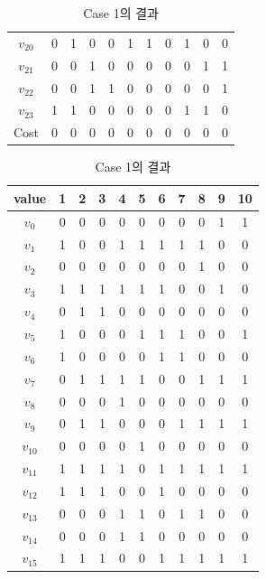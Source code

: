 \documentclass{article}
\begin{document}
\begin{table}[htb!]
\begin{minipage}{0.475\linewidth}
\begin{tabular}{c | c c c c c c c c c c}
        $v_{20}$ & 0 & 1 & 0 & 0 & 1 & 1 & 0 & 1 & 0 & 0 \\
        $v_{21}$ & 0 & 0 & 1 & 0 & 0 & 0 & 0 & 0 & 1 & 1 \\
        $v_{22}$ & 0 & 0 & 1 & 1 & 0 & 0 & 0 & 0 & 0 & 1 \\
        $v_{23}$ & 1 & 1 & 0 & 0 & 0 & 0 & 0 & 1 & 1 & 0 \\
        \hline
        Cost & 0 & 0 & 0 & 0 & 0 & 0 & 0 & 0 & 0 & 0 \\
        \hline
    \end{tabular}
    \caption{Case 1의 결과}
    \label{tab:result1}
    \end{minipage}
    \hspace{0.05\linewidth}
    \begin{minipage}{0.475\linewidth}
    \begin{tabular}{c | c c c c c c c c c c}
        \hline
        value & 1 & 2 & 3 & 4 & 5 & 6 & 7 & 8 & 9 & 10 \\
        \hline
        $v_0$ & 0 & 0 & 0 & 0 & 0 & 0 & 0 & 0 & 1 & 1 \\
        $v_1$ & 1 & 0 & 0 & 1 & 1 & 1 & 1 & 1 & 0 & 0 \\
        $v_2$ & 0 & 0 & 0 & 0 & 0 & 0 & 0 & 1 & 0 & 0 \\
        $v_3$ & 1 & 1 & 1 & 1 & 1 & 1 & 0 & 0 & 1 & 0 \\
        $v_4$ & 0 & 1 & 1 & 0 & 0 & 0 & 0 & 0 & 0 & 0 \\
        $v_5$ & 1 & 0 & 0 & 0 & 1 & 1 & 1 & 0 & 0 & 1 \\
        $v_6$ & 1 & 0 & 0 & 0 & 0 & 1 & 1 & 0 & 0 & 0 \\
        $v_7$ & 0 & 1 & 1 & 1 & 1 & 0 & 0 & 1 & 1 & 1 \\
        $v_8$ & 0 & 0 & 0 & 1 & 0 & 0 & 0 & 0 & 0 & 0 \\
        $v_9$ & 0 & 1 & 1 & 0 & 0 & 0 & 1 & 1 & 1 & 1 \\
        $v_{10}$ & 0 & 0 & 0 & 0 & 1 & 0 & 0 & 0 & 0 & 0 \\
        $v_{11}$ & 1 & 1 & 1 & 1 & 0 & 1 & 1 & 1 & 1 & 1 \\
        $v_{12}$ & 1 & 1 & 1 & 0 & 0 & 1 & 0 & 0 & 0 & 0 \\
        $v_{13}$ & 0 & 0 & 0 & 1 & 1 & 0 & 1 & 1 & 0 & 0 \\
        $v_{14}$ & 0 & 0 & 0 & 1 & 1 & 0 & 0 & 0 & 0 & 0 \\
        $v_{15}$ & 1 & 1 & 1 & 0 & 0 & 1 & 1 & 1 & 1 & 1 \\

\end{tabular}
\end{minipage}
\end{table}
\end{document}
